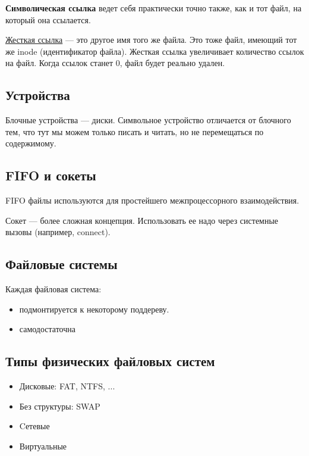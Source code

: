 \textbf{Символическая ссылка} ведет себя практически точно также, как и тот файл, на который
она ссылается.

\begin{Def}
	\underline{Жесткая ссылка} --- это другое имя того же файла. Это тоже файл, имеющий тот
	же inode (идентификатор файла). Жесткая ссылка увеличивает количество ссылок на файл.
	Когда ссылок станет 0, файл будет реально удален.
\end{Def}

\subsection{Устройства}

Блочные устройства --- диски. Символьное устройство отличается от блочного тем, что
тут мы можем только писать и читать, но не перемещаться по содержимому.


\subsection{FIFO и сокеты}

FIFO файлы используются для простейшего межпроцессорного взаимодействия.

Сокет --- более сложная концепция. Использовать ее надо через системные вызовы (например, connect).

\subsection{Файловые системы}

Каждая файловая система:
\begin{itemize}
	\item подмонтируется к некоторому поддереву.
	\item самодостаточна
\end{itemize}

\subsection{Типы физических файловых систем}

\begin{itemize}
	\item Дисковые: FAT, NTFS, ...
	\item Без структуры: SWAP	
	\item Cетевые
	\item Виртуальные
\end{itemize}

